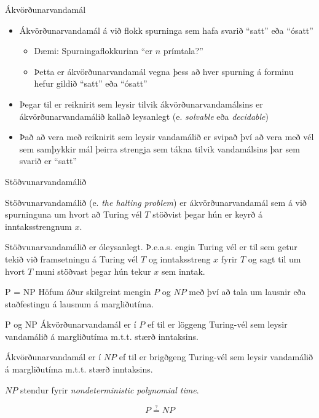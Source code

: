 \documentclass[handout]{beamer}
\begin{document}
\begin{frame}{Ákvörðunarvandamál}
\begin{itemize}
 \item Ákvörðunarvandamál á við flokk spurninga sem hafa svarið ``satt'' eða ``ósatt''
 \begin{itemize}
  \item Dæmi: Spurningaflokkurinn ``er $n$ prímtala?''
  \item Þetta er ákvörðunarvandamál vegna þess að hver spurning á forminu hefur gildið ``satt'' eða ``ósatt''
 \end{itemize}
 \item Þegar til er reiknirit sem leysir tilvik ákvörðunarvandamálsins er ákvörðunarvandamálið kallað leysanlegt (e. \emph{solvable} eða \emph{decidable})
 \item Það að vera með reiknirit sem leysir vandamálið er svipað því að vera með vél sem samþykkir mál þeirra strengja sem tákna tilvik vandamálsins þar sem svarið er ``satt''
\end{itemize}
\end{frame}

\begin{frame}{Stöðvunarvandamálið}
\begin{tcolorbox}[title=Stöðvunarvandamálið]
Stöðvunarvandamálið (e. \emph{the halting problem}) er ákvörðunarvandamál sem á við spurninguna um hvort að Turing vél $T$ stöðvist þegar hún er keyrð á inntaksstrengnum $x$.
\end{tcolorbox}

\begin{tcolorbox}[title=Óleysanleiki stöðvunarvandamálsins]
Stöðvunarvandamálið er óleysanlegt. Þ.e.a.s. engin Turing vél er til sem getur tekið við framsetningu á Turing vél $T$ og inntaksstreng $x$ fyrir $T$ og sagt til um hvort $T$ muni stöðvast þegar hún tekur $x$ sem inntak.
\end{tcolorbox}
\end{frame}

\begin{frame}{P = NP}
Höfum áður skilgreint mengin $P$ og $NP$ með því að tala um lausnir eða staðfestingu á lausnum á margliðutíma.
\begin{tcolorbox}{P og NP}
Ákvörðunarvandamál er í $P$ ef til er löggeng Turing-vél sem leysir vandamálið á margliðutíma m.t.t. stærð inntaksins.

Ákvörðunarvandamál er í $NP$ ef til er brigðgeng Turing-vél sem leysir vandamálið á margliðutíma m.t.t. stærð inntaksins.
\end{tcolorbox}
$NP$ stendur fyrir \emph{nondeterministic polynomial time}.
\end{frame}

\begin{frame}
\huge
\[
 P \overset{?}{=} NP
\]

\end{frame}
\end{document}
